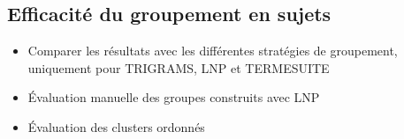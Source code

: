   \subsection{Efficacité du groupement en sujets}
  \label{subsec:efficacite_du_groupement_en_sujets}
    \begin{itemize}
      \item{Comparer les résultats avec les différentes stratégies de
            groupement, uniquement pour TRIGRAMS, LNP et TERMESUITE}
      \item{Évaluation manuelle des groupes construits avec LNP}
      \item{Évaluation des clusters ordonnés}
    \end{itemize}

